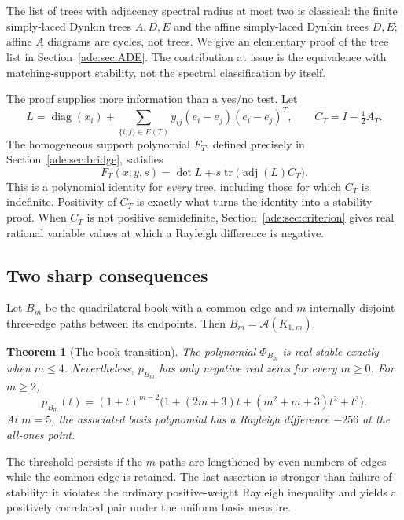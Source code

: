 \documentclass[11pt]{article}
\numberwithin{equation}{section}
\newtheorem{theorem}{Theorem}[section]
\theoremstyle{definition}
\newcommand{\diag}{\operatorname{diag}}
\newcommand{\adj}{\operatorname{adj}}
\newcommand{\tr}{\operatorname{tr}}
\newcommand{\calA}{\mathcal A}
\begin{document}
The list of trees with adjacency spectral radius at most two is classical:
the finite simply-laced Dynkin trees $A,D,E$ and the affine simply-laced
Dynkin trees $\widetilde D,\widetilde E$; affine $A$ diagrams are cycles,
not trees.  We give an elementary proof of the tree list in
Section~\ref{ade:sec:ADE}.  The contribution at issue is the equivalence with
matching-support stability, not the spectral classification by itself.

The proof supplies more information than a yes/no test.  Let
\begin{equation}
 L=\diag(x_i)+\sum_{\{i,j\}\in E(T)}y_{ij}(e_i-e_j)(e_i-e_j)^T,
 \qquad C_T=I-\tfrac12 A_T.
 \label{ade:eq:LCintro}
\end{equation}
The homogeneous support polynomial $F_T$, defined precisely in
Section~\ref{ade:sec:bridge}, satisfies
\begin{equation}
 F_T(x;y,s)=\det L+s\tr\bigl(\adj(L)C_T\bigr).
 \label{ade:eq:identityintro}
\end{equation}
This is a polynomial identity for \emph{every} tree, including those for
which $C_T$ is indefinite.  Positivity of $C_T$ is exactly what turns the
identity into a stability proof.  When $C_T$ is not positive semidefinite,
Section~\ref{ade:sec:criterion} gives real rational variable values at which a
Rayleigh difference is negative.

\subsection{Two sharp consequences}

Let $B_m$ be the quadrilateral book with a common edge and $m$ internally
disjoint three-edge paths between its endpoints.  Then
$B_m=\calA(K_{1,m})$.

\begin{theorem}[The book transition]
\label{ade:thm:introbook}
The polynomial $\Phi_{B_m}$ is real stable exactly when $m\le4$.
Nevertheless, $p_{B_m}$ has only negative real zeros for every $m\ge0$.
For $m\ge2$,
\begin{equation}
 p_{B_m}(t)=(1+t)^{m-2}
 \bigl(1+(2m+3)t+(m^2+m+3)t^2+t^3\bigr).
 \label{ade:eq:introbook}
\end{equation}
At $m=5$, the associated basis polynomial has a Rayleigh difference
$-256$ at the all-ones point.
\end{theorem}

The threshold persists if the $m$ paths are lengthened by even numbers of
edges while the common edge is retained.  The last assertion is stronger
than failure of stability: it violates the ordinary positive-weight
Rayleigh inequality and yields a positively correlated pair under the
uniform basis measure.
\end{document}

